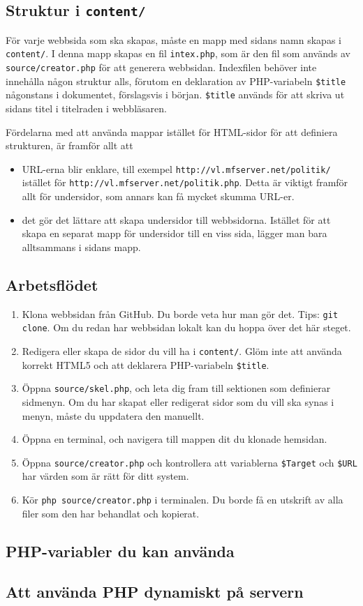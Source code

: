 \documentclass[a4paper,10pt]{article}
\begin{document}
\subsection{Struktur i {\tt content/}}
För varje webbsida som ska skapas, måste en mapp med sidans namn skapas i {\tt content/}. I denna mapp skapas en fil {\tt intex.php}, som är den fil som används av {\tt source/creator.php} för att generera webbsidan. Indexfilen behöver inte innehålla någon struktur alls, förutom en deklaration av PHP-variabeln {\tt \$title} någonstans i dokumentet, förslagsvis i början. {\tt \$title} används för att skriva ut sidans titel i titelraden i webbläsaren. 

Fördelarna med att använda mappar istället för HTML-sidor för att definiera strukturen, är framför allt att

\begin{itemize}
	\item URL-erna blir enklare, till exempel {\tt http://vl.mfserver.net/politik/} istället för {\tt http://vl.mfserver.net/politik.php}. Detta är viktigt framför allt för undersidor, som annars kan få mycket skumma URL-er. 
	\item det gör det lättare att skapa undersidor till webbsidorna. Istället för att skapa en separat mapp för undersidor till en viss sida, lägger man bara alltsammans i sidans mapp. 
\end{itemize}

\subsection{Arbetsflödet}
\begin{enumerate}
	\item Klona webbsidan från GitHub. Du borde veta hur man gör det. Tips: {\tt git clone}. Om du redan har webbsidan lokalt kan du hoppa över det här steget. 
	\item Redigera eller skapa de sidor du vill ha i {\tt content/}. Glöm inte att använda korrekt HTML5 och att deklarera PHP-variabeln {\tt \$title}. 
	\item Öppna {\tt source/skel.php}, och leta dig fram till sektionen som definierar sidmenyn. Om du har skapat eller redigerat sidor som du vill ska synas i menyn, måste du uppdatera den manuellt. 
	\item Öppna en terminal, och navigera till mappen dit du klonade hemsidan. 
	\item Öppna {\tt source/creator.php} och kontrollera att variablerna {\tt \$Target} och {\tt \$URL} har värden som är rätt för ditt system. 
	\item Kör {\tt php source/creator.php} i terminalen. Du borde få en utskrift av alla filer som den har behandlat och kopierat. 
\end{enumerate}

\subsection{PHP-variabler du kan använda}


\subsection{Att använda PHP dynamiskt på servern}
\end{document}
